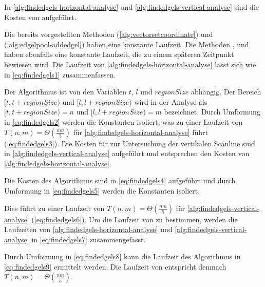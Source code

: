 In \autoref{alg:findedgels-horizontal-analyse} und \autoref{alg:findedgels-vertical-analyse} sind die Kosten von
  aufgeführt.

Die bereits vorgestellten Methoden  (\autoref{alg:vectorsetcoordinate}) und
  (\autoref{alg:edgelpool-addedgel}) haben eine konstante Laufzeit. Die Methoden
 ,  und  haben ebenfalls eine
 konstante Laufzeit, die zu einem späteren Zeitpunkt bewiesen wird.  Die Laufzeit von
 \autoref{alg:findedgels-horizontal-analyse} lässt sich wie in \autoref{eq:findedgels1} zusammenfassen.

Der Algorithmus ist von den Variablen $t$, $l$ und $\mathit{regionSize}$ abhängig. Der Bereich
 $[t,t+\mathit{regionSize})$ und $[l,l+\mathit{regionSize})$ wird in der Analyse als $[t,t+\mathit{regionSize}) = n$
 und $[l,l+\mathit{regionSize}) = m$ bezeichnet. Durch Umformung in \autoref{eq:findedgels2} werden die Konstanten
 isoliert, was zu einer Laufzeit von $T(n,m) = \Theta(\tfrac{nm}{5})$ für \autoref{alg:findedgels-horizontal-analyse}
 führt (\autoref{eq:findedgels3}). Die Kosten für  zur Untersuchung der vertikalen Scanline sind in
 \autoref{alg:findedgels-vertical-analyse} aufgeführt und entsprechen den Kosten von
 \autoref{alg:findedgels-horizontal-analyse}.

Die Kosten des Algorithmus sind in \autoref{eq:findedgels4} aufgeführt und durch Umformung in \autoref{eq:findedgels5}
 werden die Konstanten isoliert.

Dies führt zu einer Laufzeit von $T(n,m) = \Theta(\tfrac{nm}{5})$ für \autoref{alg:findedgels-vertical-analyse}
 (\autoref{eq:findedgels6}).
Um die Laufzeit von  zu bestimmen, werden die Laufzeiten von
 \autoref{alg:findedgels-horizontal-analyse} und \autoref{alg:findedgels-vertical-analyse} in \autoref{eq:findedgels7}
 zusammengefasst.

Durch Umformung in \autoref{eq:findedgels8} kann die Laufzeit des Algorithmus in \autoref{eq:findedgels9} ermittelt
 werden. Die Laufzeit von  entspricht demnach $T(n,m) = \Theta(\tfrac{nm}{5})$.

